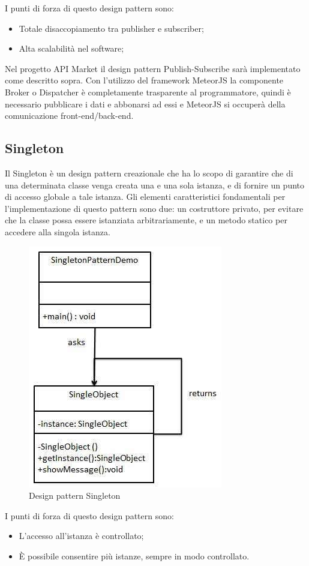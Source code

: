 I punti di forza di questo design pattern sono:
\begin{itemize}
	\item Totale disaccopiamento tra publisher e subscriber;
	\item Alta scalabilità nel software;
\end{itemize}

Nel progetto API Market il design pattern Publish-Subscribe sarà implementato come descritto sopra. Con l'utilizzo del framework MeteorJS la componente Broker o Dispatcher è completamente trasparente al programmatore, quindi è necessario pubblicare i dati e abbonarsi ad essi e MeteorJS si occuperà della comunicazione front-end/back-end.

\subsection{Singleton}
Il Singleton è un design pattern creazionale che ha lo scopo di garantire che di una determinata classe venga creata una e una sola istanza, e di fornire un punto di accesso globale a tale istanza.
Gli elementi caratteristici fondamentali per l'implementazione di questo pattern sono due: un costruttore privato, per evitare che la classe possa essere istanziata arbitrariamente, e un metodo statico per accedere alla singola istanza.
\begin{figure}
	\centering
	\includegraphics[width=0.7\linewidth]{IMG/singleton_pattern}
	\caption{Design pattern Singleton}
\end{figure}

I punti di forza di questo design pattern sono:
\begin{itemize}
	\item L'accesso all'istanza è controllato;
	\item \MakeUppercase{è} possibile consentire più istanze, sempre in modo controllato.
\end{itemize}

